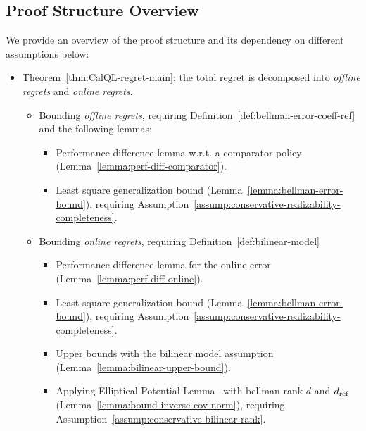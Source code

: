 \subsection{Proof Structure Overview}
We provide an overview of the proof structure and its dependency on different assumptions below:
\begin{itemize}
    \item Theorem~\ref{thm:CalQL-regret-main}: the total regret is decomposed into {\em offline regrets} and {\em online regrets}.
    \begin{itemize}
        \item Bounding {\em offline regrets}, requiring Definition~\ref{def:bellman-error-coeff-ref} and the following lemmas:
        \begin{itemize}
            \item Performance difference lemma w.r.t. a comparator policy (Lemma~\ref{lemma:perf-diff-comparator}).
            \item Least square generalization bound (Lemma~\ref{lemma:bellman-error-bound}), requiring Assumption~\ref{assump:conservative-realizability-completeness}.
        \end{itemize}
        \item Bounding {\em online regrets}, requiring Definition~\ref{def:bilinear-model}
        \begin{itemize}
            \item Performance difference lemma for the online error (Lemma~\ref{lemma:perf-diff-online}).
            \item Least square generalization bound (Lemma~\ref{lemma:bellman-error-bound}), requiring Assumption~\ref{assump:conservative-realizability-completeness}.
            \item Upper bounds with the bilinear model assumption (Lemma~\ref{lemma:bilinear-upper-bound}).
            \item Applying Elliptical Potential Lemma~\cite{lattimore2020bandit} with bellman rank $d$ and $d_\mathrm{ref}$ (Lemma~\ref{lemma:bound-inverse-cov-norm}), requiring Assumption~\ref{assump:conservative-bilinear-rank}.
        \end{itemize}
    \end{itemize}
\end{itemize}

